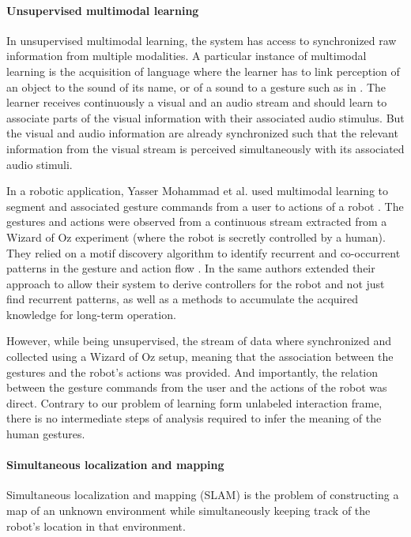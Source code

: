 \paragraph{Unsupervised multimodal learning} In unsupervised multimodal learning, the system has access to synchronized raw information from multiple modalities. A particular instance of multimodal learning is the acquisition of language where the learner has to link perception of an object to the sound of its name, or of a sound to a gesture such as in \cite{mangin2013learning}. The learner receives continuously a visual and an audio stream and should learn to associate parts of the visual information with their associated audio stimulus. But the visual and audio information are already synchronized such that the relevant information from the visual stream is perceived simultaneously with its associated audio stimuli.

In a robotic application, Yasser Mohammad et al. used multimodal learning to segment and associated gesture commands from a user to actions of a robot \cite{mohammad2009unsupervised}. The gestures and actions were observed from a continuous stream extracted from a Wizard of Oz experiment (where the robot is secretly controlled by a human). They relied on a motif discovery algorithm to identify recurrent and co-occurrent patterns in the gesture and action flow \cite{mohammad2009constrained}. In \cite{mohammad2010learning} the same authors extended their approach to allow their system to derive controllers for the robot and not just find recurrent patterns, as well as a methods to accumulate the acquired knowledge for long-term operation.

However, while being unsupervised, the stream of data where synchronized and collected using a Wizard of Oz setup, meaning that the association between the gestures and the robot's actions was provided. And importantly, the relation between the gesture commands from the user and the actions of the robot was direct. Contrary to our problem of learning form unlabeled interaction frame, there is no intermediate steps of analysis required to infer the meaning of the human gestures.

\paragraph{Simultaneous localization and mapping}

Simultaneous localization and mapping (SLAM) \cite{smith1990estimating,dissanayake2001solution} is  the problem of constructing a map of an unknown environment while simultaneously keeping track of the robot's location in that environment. 

